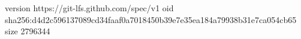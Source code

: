 version https://git-lfs.github.com/spec/v1
oid sha256:d4d2c596137089cd34faaf0a7018450b39e7e35ea184a79938b31e7ca054cb65
size 2796344
